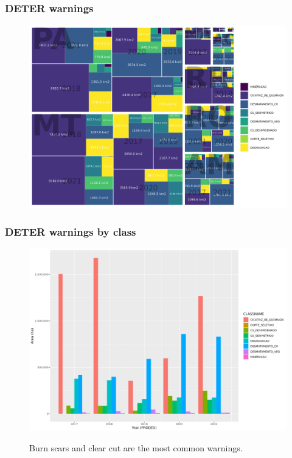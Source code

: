 \documentclass[aspectratio=169]{beamer}
\begin{document}
\begin{frame}
    \frametitle{DETER warnings}
    \begin{figure}[h] 
        \includegraphics[width=0.75\linewidth]
        {./figures/plot_deter_area_by_state_pyear_type.png}
        \label{fig:deter_area_state_pyear_type}
    \end{figure}
\end{frame}

%     

\begin{frame}
    \frametitle{DETER warnings by class}
    \begin{figure}[h]
        \includegraphics[width=0.65\linewidth]
        {./figures/plot_deter_area_by_class.png}
        \label{fig:deter_area_by_class}
        \caption{Burn scars and clear cut are the most common warnings.}
    \end{figure}
\end{frame}
\end{document}
